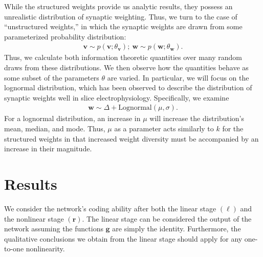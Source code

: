 \documentclass[12pt]{article}
\begin{document}
While the structured weights provide us analytic results, they possess an unrealistic distribution of synaptic weighting. Thus, we turn to the case of ``unstructured weights,'' in which the synaptic weights are drawn from some parameterized probability distribution:
\begin{align}
\mathbf{v} \sim p(\mathbf{v}; \theta_{\mathbf{v}}); \ \mathbf{w} \sim p(\mathbf{w}; \theta_{\mathbf{w}}).
\end{align}
Thus, we  calculate both information theoretic quantities over many random draws from these distributions. We then observe how the quantities behave as some subset of the parameters $\theta$ are varied. In particular, we will focus on the lognormal distribution, which has been observed to describe the distribution of synaptic weights well in slice electrophysiology. Specifically, we examine 
\begin{align}
\mathbf{w}\sim \Delta + \text{Lognormal}(\mu, \sigma).
\end{align}
For a lognormal distribution, an increase in $\mu$ will increase the distribution's mean, median, and mode. Thus, $\mu$ as a parameter acts similarly to $k$ for the structured weights in that increased weight diversity must be accompanied by an increase in their magnitude.

\section{Results}
We consider the network's coding ability after both the linear stage $(\boldsymbol{\ell})$ and the nonlinear stage $(\mathbf{r})$. The linear stage can be considered the output of the network assuming the functions $\mathbf{g}$ are simply the identity. Furthermore, the qualitative conclusions we obtain from the linear stage should apply for any one-to-one nonlinearity. 
	
\end{document}
